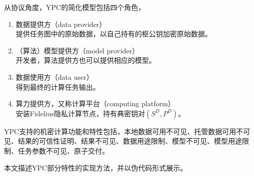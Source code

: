 从协议角度，YPC的简化模型包括四个角色，
\begin{enumerate}
    \item 数据提供方（data provider）\\ 
    提供任务图中的原始数据，以自己持有的枢公钥加密原始数据。
    \item （算法）模型提供方（model provider）\\ 
    开发者，算法提供方也可以提供相应的模型。
    \item 数据使用方（data user）\\ 
    得到最终的计算任务输出。
    \item 算力提供方，又称计算平台（computing platform）\\ 
    安装Fidelius隐私计算节点，持有典密钥对$(S^D, P^D)$。
\end{enumerate}

YPC支持的机密计算功能和特性包括，本地数据可用不可见、托管数据可用不可见、结果的可信性证明、结果不可见、数据用途限制、模型不可见、模型用途限制、任务参数不可见、原子交付。

本文描述YPC部分特性的实现方法，并以伪代码形式展示。

